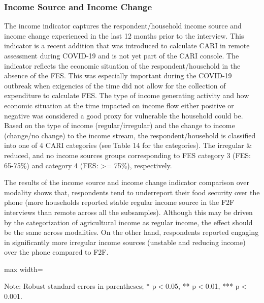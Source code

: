 \documentclass[11pt,harvard]{article}
\begin{document}
\subsubsection{Income Source and Income Change}
The income indicator captures the respondent/household income source and income change experienced in the last 12 months prior to the interview. This indicator is a recent addition that was introduced to calculate CARI in remote assessment during COVID-19 and is not yet part of the CARI console. The indicator reflects the economic situation of the respondent/household in the absence of the FES. This was especially important during the COVID-19 outbreak when exigencies of the time did not allow for the collection of expenditure to calculate FES. The type of income generating activity and how economic situation at the time impacted on income flow either positive or negative was considered a good proxy for vulnerable the household could be. Based on the type of income (regular/irregular) and the change to income (change/no change) to the income stream, the respondent/household is classified into one of 4 CARI categories (see Table 14 for the categories). The irregular \& reduced, and no income sources groups corresponding to FES category 3 (FES: 65-75\%) and category 4 (FES: >= 75\%), respectively.

The results of the income source and income change indicator comparison over modality shows that, respondents tend to underreport their food security over the phone (more households reported stable regular income source in the F2F interviews than remote across all the subsamples). Although this may be driven by the categorization of agricultural income as regular income, the effect should be the same across modalities. On the other hand, respondents reported engaging in significantly more irregular income sources (unstable and reducing income) over the phone compared to F2F. 

	\begin{table}[htbp]
		\centering
		\begin{adjustbox}{max width=\textwidth}
			\begin{threeparttable}
				\caption{Impact of Survey Modality on Income}
				\scriptsize
				 
				\label{tab:INC_Modality_CAR}
				\begin{tablenotes}
					\item Note: Robust standard errors in parentheses; * p$<$0.05, ** p$<$0.01, *** p$<$0.001.
				\end{tablenotes}
			\end{threeparttable}
		\end{adjustbox}
	\end{table}
\end{document}
